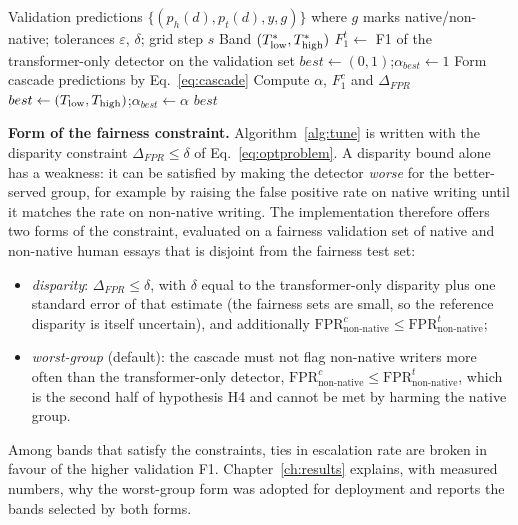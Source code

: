 \begin{algorithm}[H]
\caption{Validation-based tuning of the ambiguity band}
\label{alg:tune}
\begin{algorithmic}[1]
\Require Validation predictions $\{(p_h(d), p_t(d), y, g)\}$ where $g$ marks native/non-native; tolerances $\varepsilon$, $\delta$; grid step $s$
\Ensure Band $(T_{\mathrm{low}}^{*},T_{\mathrm{high}}^{*})$
\State $F_1^{t} \gets$ F1 of the transformer-only detector on the validation set
\State $best \gets (0,1)$;\quad $\alpha_{best} \gets 1$
     \State Form cascade predictions by Eq.~\eqref{eq:cascade}
     \State Compute $\alpha$, $F_1^{c}$ and $\Delta_{FPR}$
        \State $best \gets (T_{\mathrm{low}},T_{\mathrm{high}})$;\quad $\alpha_{best} \gets \alpha$
     \EndIf
  \EndFor
\EndFor
\State \Return $best$
\end{algorithmic}
\end{algorithm}

\textbf{Form of the fairness constraint.} Algorithm~\ref{alg:tune} is written
with the disparity constraint $\Delta_{FPR} \le \delta$ of
Eq.~\eqref{eq:optproblem}. A disparity bound alone has a weakness: it can be
satisfied by making the detector \emph{worse} for the better-served group,
for example by raising the false positive rate on native writing until it
matches the rate on non-native writing. The implementation therefore offers
two forms of the constraint, evaluated on a fairness validation set of native
and non-native human essays that is disjoint from the fairness test set:
\begin{itemize}
  \item \emph{disparity}: $\Delta_{FPR} \le \delta$, with $\delta$ equal to the
        transformer-only disparity plus one standard error of that estimate
        (the fairness sets are small, so the reference disparity is itself
        uncertain), and additionally
        $\mathrm{FPR}^{c}_{\text{non-native}} \le \mathrm{FPR}^{t}_{\text{non-native}}$;
  \item \emph{worst-group} (default): the cascade must not flag non-native
        writers more often than the transformer-only detector,
        $\mathrm{FPR}^{c}_{\text{non-native}} \le \mathrm{FPR}^{t}_{\text{non-native}}$,
        which is the second half of hypothesis H4 and cannot be met by harming
        the native group.
\end{itemize}
Among bands that satisfy the constraints, ties in escalation rate are broken
in favour of the higher validation F1. Chapter~\ref{ch:results} explains,
with measured numbers, why the worst-group form was adopted for deployment
and reports the bands selected by both forms.

